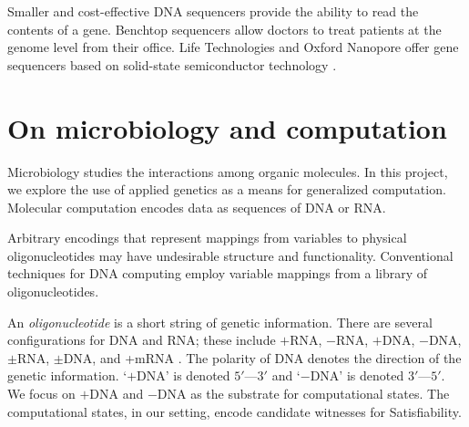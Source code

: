 Smaller and cost-effective DNA sequencers provide the ability to read the contents of a gene.  Benchtop sequencers \cite{ionTorrent, oxfordNanopore} allow doctors to treat patients at the genome level from their office.  Life Technologies and Oxford Nanopore offer gene sequencers based on solid-state semiconductor technology \cite{ionTorrent, oxfordNanopore}.	

\section{On microbiology and computation}

	
	Microbiology studies the interactions among organic molecules.  In this project, we explore the use of applied genetics as a means for generalized computation.  Molecular computation encodes data as sequences of DNA or RNA.  

	Arbitrary encodings that represent mappings from variables to physical oligonucleotides may have undesirable structure and functionality.  Conventional techniques for DNA computing employ variable mappings from a library of oligonucleotides.
	
		

	
	An \textit{oligonucleotide} is a short string of genetic information.  There are several configurations for DNA and RNA; these include $+$RNA, $-$RNA, $+$DNA, $-$DNA, $\pm$RNA, $\pm$DNA, and +mRNA \cite{baltimore1971exp}.  The polarity of DNA denotes the direction of the genetic information.  `$+$DNA' is denoted $5'$---$3'$ and `$-$DNA' is denoted $3'$---$5'$.  We focus on $+$DNA and $-$DNA as the substrate for computational states.  The computational states, in our setting, encode candidate witnesses for {\sc Satisfiability}.


